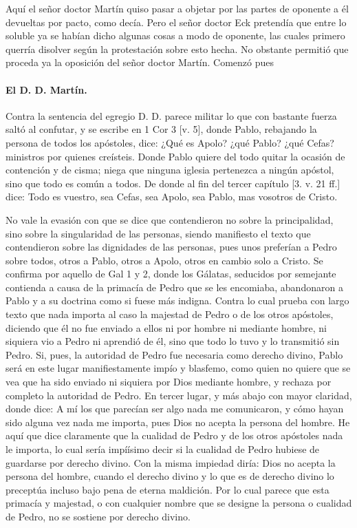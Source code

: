 Aquí el señor doctor Martín quiso pasar a objetar por las partes de oponente a él devueltas por pacto, como decía. Pero el señor doctor Eck pretendía que entre lo soluble ya se habían dicho algunas cosas a modo de oponente, las cuales primero querría disolver según la protestación sobre esto hecha. No obstante permitió que proceda ya la oposición del señor doctor Martín. Comenzó pues

\paragraph*{El D. D. Martín.}

Contra la sentencia del egregio D. D. parece militar lo que con bastante fuerza saltó al confutar, y se escribe en 1 Cor 3 [v. 5], donde Pablo, rebajando \marginpar{\small[304]} la persona de todos los apóstoles, dice: ¿Qué es Apolo? ¿qué Pablo? ¿qué Cefas? ministros por quienes creísteis. Donde Pablo quiere del todo quitar la ocasión de contención y de cisma; niega que ninguna iglesia pertenezca a ningún apóstol, sino que todo es común a todos. De donde al fin del tercer capítulo [3. v. 21 ff.] dice: Todo es vuestro, sea Cefas, sea Apolo, sea Pablo, mas vosotros de Cristo.

No vale la evasión con que se dice que contendieron no sobre la principalidad, sino sobre la singularidad de las personas, siendo manifiesto el texto que contendieron sobre las dignidades de las personas, pues unos preferían a Pedro sobre todos, otros a Pablo, otros a Apolo, otros en cambio solo a Cristo. Se confirma por aquello de Gal 1 y 2, donde los Gálatas, seducidos por semejante contienda a causa de la primacía de Pedro que se les encomiaba, abandonaron a Pablo y a su doctrina como si fuese más indigna. Contra lo cual prueba con largo texto que nada importa al caso la majestad de Pedro o de los otros apóstoles, diciendo que él no fue enviado a ellos ni por hombre ni mediante hombre, ni siquiera vio a Pedro ni aprendió de él, sino que todo lo tuvo y lo transmitió sin Pedro. Si, pues, la autoridad de Pedro fue necesaria como derecho divino, Pablo será en este lugar manifiestamente impío y blasfemo, como quien no quiere que se vea que ha sido enviado ni siquiera por Dios mediante hombre, y rechaza por completo la autoridad de Pedro. En tercer lugar, y más abajo con mayor claridad, donde dice: A mí los que parecían ser algo nada me comunicaron, y cómo hayan sido alguna vez nada me importa, pues Dios no acepta la persona del hombre. He aquí que dice claramente que la cualidad de Pedro y de los otros apóstoles nada le importa, lo cual sería impíísimo decir si la cualidad de Pedro hubiese de guardarse por derecho divino. Con la misma impiedad diría: Dios no acepta la persona del hombre, cuando el derecho divino y lo que es de derecho divino lo preceptúa incluso bajo pena de eterna maldición. Por lo cual parece que esta primacía y majestad, o con cualquier nombre que se designe la persona o cualidad de Pedro, no se sostiene por derecho divino.

